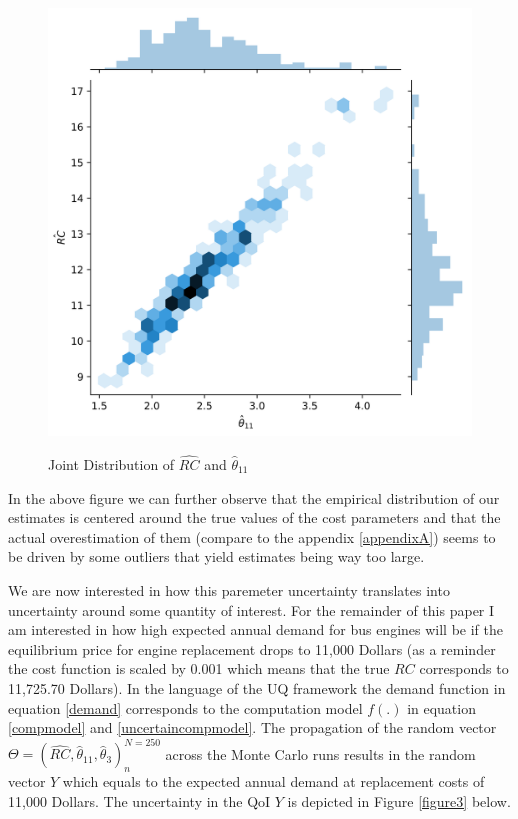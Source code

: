 \begin{figure}[H]
	\caption{Joint Distribution of $\hat{RC}$ and $\hat\theta_{11}$}
	\centering
	\includegraphics[scale=0.8]{../figures/figure_2.png}
	\label{figure2}
\end{figure}

In the above figure we can further observe that the empirical distribution of our estimates is centered around the true values of the cost parameters and that the actual overestimation of them (compare to the appendix \ref{appendixA}) seems to be driven by some outliers that yield estimates being way too large.

We are now interested in how this paremeter uncertainty translates into uncertainty around some quantity of interest. For the remainder of this paper I am interested in how high expected annual demand for bus engines will be if the equilibrium price for engine replacement drops to 11,000 Dollars (as a reminder the cost function is scaled by 0.001 which means that the true $RC$ corresponds to 11,725.70 Dollars). In the language of the UQ framework the demand function in equation \ref{demand} corresponds to the computation model $f(.)$ in equation \ref{compmodel} and \ref{uncertaincompmodel}. The propagation of the random vector $\Theta = (\hat{RC}, \hat\theta_{11}, \hat\theta_3)^{N=250}_n$ across the Monte Carlo runs results in the random vector $Y$ which equals to the expected annual demand at replacement costs of 11,000 Dollars. The uncertainty in the QoI $Y$ is depicted in Figure \ref{figure3} below.

